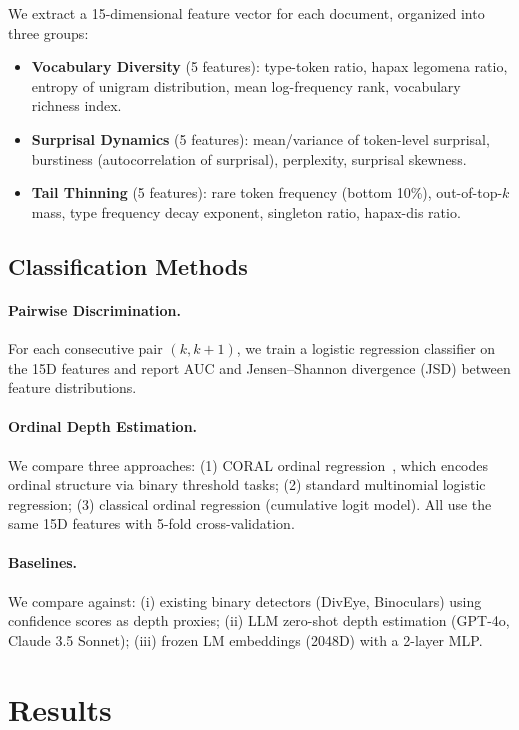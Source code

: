 \documentclass[11pt,a4paper]{article}
\begin{document}
We extract a 15-dimensional feature vector for each document, organized into three groups:

\begin{itemize}
\item \textbf{Vocabulary Diversity} (5 features): type-token ratio, hapax legomena ratio, entropy of unigram distribution, mean log-frequency rank, vocabulary richness index.
\item \textbf{Surprisal Dynamics} (5 features): mean/variance of token-level surprisal, burstiness (autocorrelation of surprisal), perplexity, surprisal skewness.
\item \textbf{Tail Thinning} (5 features): rare token frequency (bottom 10\%), out-of-top-$k$ mass, type frequency decay exponent, singleton ratio, hapax-dis ratio.
\end{itemize}

\subsection{Classification Methods}

\paragraph{Pairwise Discrimination.} For each consecutive pair $(k, k+1)$, we train a logistic regression classifier on the 15D features and report AUC and Jensen--Shannon divergence (JSD) between feature distributions.

\paragraph{Ordinal Depth Estimation.} We compare three approaches: (1) CORAL ordinal regression~\cite{coral}, which encodes ordinal structure via binary threshold tasks; (2) standard multinomial logistic regression; (3) classical ordinal regression (cumulative logit model). All use the same 15D features with 5-fold cross-validation.

\paragraph{Baselines.} We compare against: (i) existing binary detectors (DivEye, Binoculars) using confidence scores as depth proxies; (ii) LLM zero-shot depth estimation (GPT-4o, Claude 3.5 Sonnet); (iii) frozen LM embeddings (2048D) with a 2-layer MLP.

\section{Results}
\end{document}
